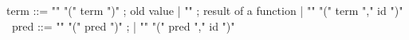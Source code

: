 \begin{syntax}
  term ::= "\old" "(" term ")" ; old value
       | "\result" ; result of a function
       | "\at" "(" term "," id ")" 
       \
  pred ::= "\old" "(" pred ")" ;
       | "\at" "(" pred "," id ")" 
\end{syntax}

